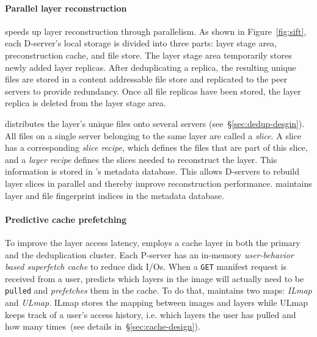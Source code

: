 \paragraph{Parallel layer reconstruction}
%
\sysname speeds up layer reconstruction through parallelism.
%
As shown in Figure~\ref{fig:sift}, each D-server's local storage is divided
into three parts: layer stage area, preconstruction cache, and file store.
%
The layer stage area temporarily stores newly added layer replicas.
%
After deduplicating a replica, the resulting unique files are stored in a
content addressable file store and replicated to the peer servers to provide
redundancy. Once all file replicas have been stored, the layer replica is deleted
from the layer stage area.%
%

\sysname distributes the layer's unique files onto several servers
(see~\S\ref{sec:dedup-desgin}).
%
All files on a single server belonging to the same layer are called a
\emph{slice}.
%
A slice has a corresponding \emph{slice recipe}, which defines the files that
are part of this slice, and a \emph{layer recipe} defines the slices needed to
reconstruct the layer.
%
This information is stored in \sysname{}'s metadata database.
%
This allows D-servers to rebuild layer slices in parallel and thereby improve
reconstruction performance.
%
\sysname maintains layer and file fingerprint indices in the
metadata database.




\paragraph{Predictive cache prefetching}
%
To improve the layer access latency, \sysname employs a cache layer in both the
primary and the deduplication cluster.
%
Each P-server has an in-memory \emph{user-behavior based superfetch cache} to
reduce disk I/Os.
%
When a \texttt{GET} manifest request is received from a user, \sysname
predicts which layers in the image will actually need to be \texttt{pulled} and
\emph{prefetches} them in the cache.
%
To do that, \sysname maintains two maps: \emph{ILmap} and \emph{ULmap}.
%
ILmap stores the mapping between images and layers while ULmap keeps track of a
user's access history, i.e. which layers the user has pulled and how many
times~(see details in~\S\ref{sec:cache-design}).

